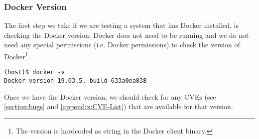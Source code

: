 \subsubsection{Docker Version}
The first step we take if we are testing a system that has Docker installed, is checking the Docker version. Docker does not need to be running and we do not need any special permissions (i.e. Docker permissions) to check the version of Docker\footnote{The version is hardcoded as string in the Docker client binary.}.

\begin{lstlisting}[caption={Show Docker version.},captionpos=b]
(host)$ docker -v
Docker version 19.03.5, build 633a0ea838
\end{lstlisting}

Once we have the Docker version, we should check for any CVEs (see \autoref{section:bugs} and \autoref{appendix:CVE-List}) that are available for that version.
